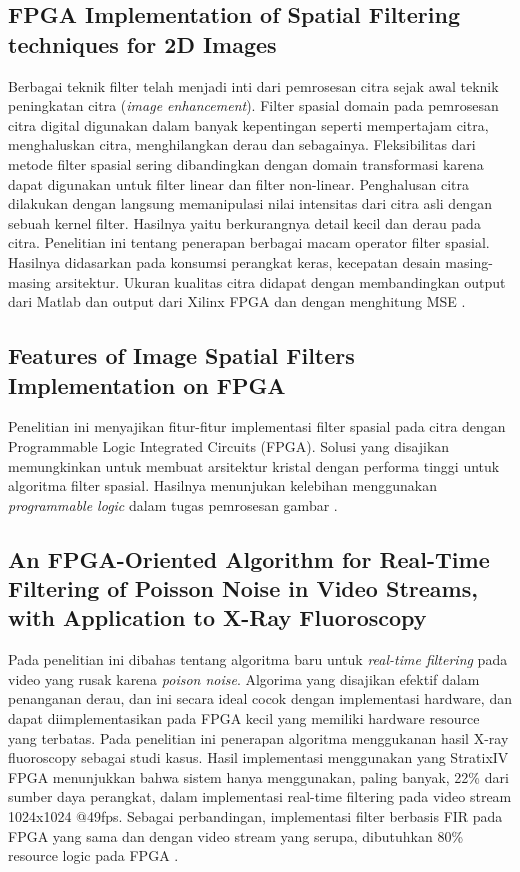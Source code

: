 \subsection{FPGA Implementation of Spatial Filtering techniques for 2D Images}
Berbagai teknik filter telah menjadi inti dari pemrosesan citra sejak awal teknik peningkatan citra (\textit{image enhancement}). Filter spasial domain pada pemrosesan citra digital digunakan dalam banyak kepentingan seperti mempertajam citra, menghaluskan citra, menghilangkan derau dan sebagainya. Fleksibilitas dari metode filter spasial sering dibandingkan dengan domain transformasi karena dapat digunakan untuk filter linear dan filter non-linear. Penghalusan citra dilakukan dengan langsung memanipulasi nilai intensitas dari citra asli dengan sebuah kernel filter. Hasilnya yaitu berkurangnya detail kecil dan derau pada citra. Penelitian ini tentang penerapan berbagai macam operator filter spasial. Hasilnya didasarkan pada konsumsi perangkat keras, kecepatan desain masing-masing arsitektur. Ukuran kualitas citra didapat dengan membandingkan output dari Matlab dan output dari Xilinx FPGA dan dengan menghitung MSE .

\subsection{Features of Image Spatial Filters Implementation on FPGA}
Penelitian ini menyajikan fitur-fitur implementasi filter spasial pada citra dengan Programmable Logic Integrated Circuits (FPGA). Solusi yang disajikan memungkinkan untuk membuat arsitektur kristal dengan performa tinggi untuk algoritma filter spasial. Hasilnya menunjukan kelebihan menggunakan \textit{programmable logic} dalam tugas pemrosesan gambar .

\subsection{An FPGA-Oriented Algorithm for Real-Time Filtering of Poisson Noise in Video Streams, with Application to X-Ray Fluoroscopy}
Pada penelitian ini dibahas tentang algoritma baru untuk \textit{real-time filtering} pada video yang rusak karena \textit{poison noise}. Algorima yang disajikan efektif dalam penanganan derau, dan ini secara ideal cocok dengan implementasi hardware, dan dapat diimplementasikan pada FPGA kecil yang memiliki hardware resource yang terbatas. Pada penelitian ini penerapan algoritma menggukanan hasil X-ray fluoroscopy sebagai studi kasus. Hasil implementasi menggunakan yang StratixIV FPGA menunjukkan bahwa sistem hanya menggunakan, paling banyak, 22\% dari sumber daya perangkat, dalam implementasi real-time filtering pada video stream 1024x1024 @49fps. Sebagai perbandingan, implementasi filter berbasis FIR pada FPGA yang sama dan dengan video stream yang serupa, dibutuhkan 80\% resource logic pada FPGA .

